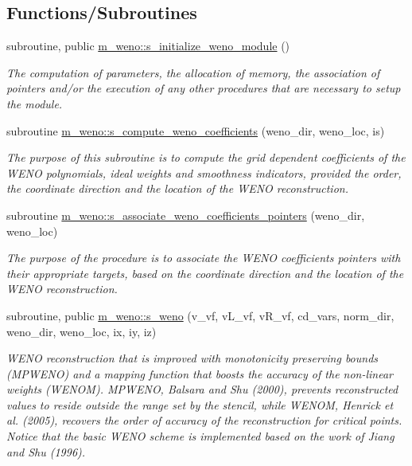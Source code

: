 \subsection*{Functions/\+Subroutines}
\begin{DoxyCompactItemize}
\item 
subroutine, public \hyperlink{namespacem__weno_a0c42f0718a03dafe119ac88c17bcda78}{m\+\_\+weno\+::s\+\_\+initialize\+\_\+weno\+\_\+module} ()
\begin{DoxyCompactList}\small\item\em The computation of parameters, the allocation of memory, the association of pointers and/or the execution of any other procedures that are necessary to setup the module. \end{DoxyCompactList}\item 
subroutine \hyperlink{namespacem__weno_ac16dc64bea94d533366e3462ddb351a6}{m\+\_\+weno\+::s\+\_\+compute\+\_\+weno\+\_\+coefficients} (weno\+\_\+dir, weno\+\_\+loc, is)
\begin{DoxyCompactList}\small\item\em The purpose of this subroutine is to compute the grid dependent coefficients of the W\+E\+NO polynomials, ideal weights and smoothness indicators, provided the order, the coordinate direction and the location of the W\+E\+NO reconstruction. \end{DoxyCompactList}\item 
subroutine \hyperlink{namespacem__weno_adcb329b727281d1855405733054b996e}{m\+\_\+weno\+::s\+\_\+associate\+\_\+weno\+\_\+coefficients\+\_\+pointers} (weno\+\_\+dir, weno\+\_\+loc)
\begin{DoxyCompactList}\small\item\em The purpose of the procedure is to associate the W\+E\+NO coefficients\textquotesingle{} pointers with their appropriate targets, based on the coordinate direction and the location of the W\+E\+NO reconstruction. \end{DoxyCompactList}\item 
subroutine, public \hyperlink{namespacem__weno_a1bf39ea6e0044dcc912763ff5acac69d}{m\+\_\+weno\+::s\+\_\+weno} (v\+\_\+vf, v\+L\+\_\+vf, v\+R\+\_\+vf, cd\+\_\+vars, norm\+\_\+dir, weno\+\_\+dir, weno\+\_\+loc, ix, iy, iz)
\begin{DoxyCompactList}\small\item\em W\+E\+NO reconstruction that is improved with monotonicity preserving bounds (M\+P\+W\+E\+NO) and a mapping function that boosts the accuracy of the non-\/linear weights (W\+E\+N\+OM). M\+P\+W\+E\+NO, Balsara and Shu (2000), prevents reconstructed values to reside outside the range set by the stencil, while W\+E\+N\+OM, Henrick et al. (2005), recovers the order of accuracy of the reconstruction for critical points. Notice that the basic W\+E\+NO scheme is implemented based on the work of Jiang and Shu (1996). \end{DoxyCompactList}\item 

\end{DoxyCompactItemize}
